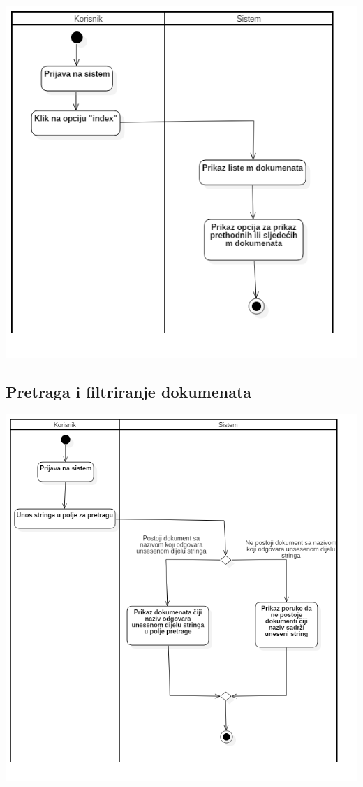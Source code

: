 \begin{center}
    \includegraphics[scale=0.8]{images/PrikazSvihKorisnikovihPdfDokumenata.png}
\end{center}

\subsection{Pretraga i filtriranje dokumenata}

\begin{center}
    \includegraphics[scale=0.6]{images/PretragaIFiltriranjeDokumenata.png}
\end{center}


